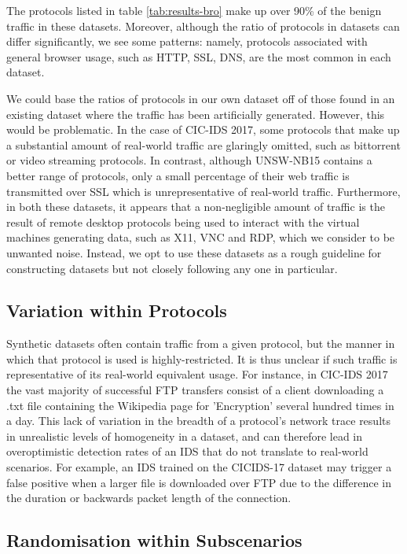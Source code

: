 \documentclass[sigconf,anonymous]{acmart}\usepackage[]{graphicx}\usepackage[]{color}
\begin{document}
The protocols listed in table \ref{tab:results-bro} make up over 90\% of the benign traffic in these datasets. Moreover, although the ratio of protocols in datasets can differ significantly, we see some patterns: namely, protocols associated with general browser usage, such as HTTP, SSL, DNS, are the most common in each dataset. 

We could base the ratios of protocols in our own dataset off of those found in an existing dataset where the traffic has been artificially generated. However, this would be problematic. In the case of CIC-IDS 2017, some protocols that make up a substantial amount of real-world traffic are glaringly omitted, such as bittorrent or video streaming protocols. In contrast, although UNSW-NB15 contains a better range of protocols, only a small percentage of their web traffic is transmitted over SSL which is  unrepresentative of real-world traffic. Furthermore, in both these datasets, it appears that a non-negligible amount of traffic is the result of remote desktop protocols being used to interact with the virtual machines generating data, such as X11, VNC and RDP, which we consider to be unwanted noise. Instead, we opt to use these datasets as a rough guideline for constructing datasets but not closely following any one in particular.

\subsection{Variation within Protocols}

Synthetic datasets often contain traffic from a given protocol, but the manner in which that protocol is used is highly-restricted. It is thus unclear if such traffic is representative of its real-world equivalent usage. For instance, in CIC-IDS 2017 the vast majority of successful FTP transfers consist of a client downloading a .txt file containing the Wikipedia page for 'Encryption' several hundred times in a day. This lack of variation in the breadth of a protocol's network trace results in unrealistic levels of homogeneity in a dataset, and can therefore lead in overoptimistic detection rates of an IDS that do not translate to real-world scenarios. For example, an IDS trained on the CICIDS-17 dataset may trigger a false positive when a larger file is downloaded over FTP due to the difference in the duration or backwards packet length of the connection. 


\subsection{Randomisation within Subscenarios}
\label{sec:randomsubscen}
\end{document}

